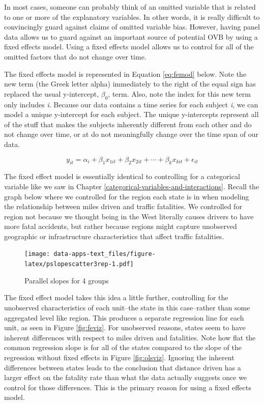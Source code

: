 \documentclass[
]{book}
\begin{document}
In most cases, someone can probably think of an omitted variable that is related to one or more of the explanatory variables. In other words, it is really difficult to convincingly guard against claims of omitted variable bias. However, having panel data allows us to guard against an important source of potential OVB by using a fixed effects model. Using a fixed effects model allows us to control for all of the omitted factors that do not change over time.

The fixed effects model is represented in Equation \eqref{eq:femod} below. Note the new term (the Greek letter alpha) immediately to the right of the equal sign has replaced the usual y-intercept, \(\beta_0\), term. Also, note the index for this new term only includes \emph{i}. Because our data contains a time series for each subject \emph{i}, we can model a unique y-intercept for each subject. The unique y-intercepts represent all of the stuff that makes the subjects inherently different from each other and do not change over time, or at do not meaningfully change over the time span of our data.

\begin{equation}
y_{it}=\alpha_{i}+\beta_1x_{1it}+\beta_2x_{2it}+\cdots+\beta_kx_{kit}+\epsilon_{it}
\label{eq:femod}
\end{equation}

The fixed effect model is essentially identical to controlling for a categorical variable like we saw in Chapter \ref{categorical-variables-and-interactions}. Recall the graph below where we controlled for the region each state is in when modeling the relationship between miles driven and traffic fatalities. We controlled for region not because we thought being in the West literally causes drivers to have more fatal accidents, but rather because regions might capture unobserved geographic or infrastructure characteristics that affect traffic fatalities.

\begin{figure}
\centering
\texttt{[image: data-apps-text\_files/figure-latex/pslopescatter3rep-1.pdf]}
\caption{\label{fig:pslopescatter3rep}Parallel slopes for 4 groups}
\end{figure}

The fixed effect model takes this idea a little further, controlling for the unobserved characteristics of each unit--the state in this case--rather than some aggregated level like region. This produces a separate regression line for each unit, as seen in Figure \ref{fig:feviz}. For unobserved reasons, states seem to have inherent differences with respect to miles driven and fatalities. Note how flat the common regression slope is for all of the states compared to the slope of the regression without fixed effects in Figure \ref{fig:olsviz}. Ignoring the inherent differences between states leads to the conclusion that distance driven has a larger effect on the fatality rate than what the data actually suggests once we control for those differences. This is the primary reason for using a fixed effects model.
\end{document}
